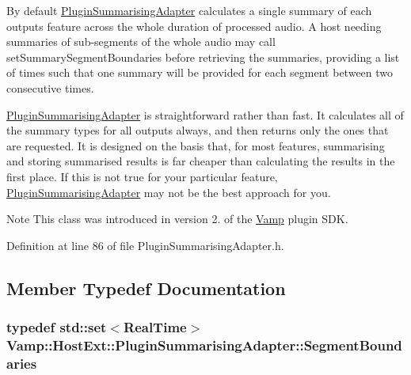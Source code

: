 By default \hyperlink{class_vamp_1_1_host_ext_1_1_plugin_summarising_adapter}{Plugin\+Summarising\+Adapter} calculates a single summary of each output\textquotesingle{}s feature across the whole duration of processed audio. A host needing summaries of sub-\/segments of the whole audio may call set\+Summary\+Segment\+Boundaries before retrieving the summaries, providing a list of times such that one summary will be provided for each segment between two consecutive times.

\hyperlink{class_vamp_1_1_host_ext_1_1_plugin_summarising_adapter}{Plugin\+Summarising\+Adapter} is straightforward rather than fast. It calculates all of the summary types for all outputs always, and then returns only the ones that are requested. It is designed on the basis that, for most features, summarising and storing summarised results is far cheaper than calculating the results in the first place. If this is not true for your particular feature, \hyperlink{class_vamp_1_1_host_ext_1_1_plugin_summarising_adapter}{Plugin\+Summarising\+Adapter} may not be the best approach for you.

\begin{DoxyNote}{Note}
This class was introduced in version 2. of the \hyperlink{namespace_vamp}{Vamp} plugin S\+DK. 
\end{DoxyNote}


Definition at line 86 of file Plugin\+Summarising\+Adapter.\+h.



\subsection{Member Typedef Documentation}
\subsubsection[{\texorpdfstring{Segment\+Boundaries}{SegmentBoundaries}}]{\setlength{\rightskip}{0pt plus 5cm}typedef std\+::set$<${\bf Real\+Time}$>$ {\bf Vamp\+::\+Host\+Ext\+::\+Plugin\+Summarising\+Adapter\+::\+Segment\+Boundaries}}\hypertarget{class_vamp_1_1_host_ext_1_1_plugin_summarising_adapter_a74e7f93c745802a2409185b63922466b}{}\label{class_vamp_1_1_host_ext_1_1_plugin_summarising_adapter_a74e7f93c745802a2409185b63922466b}


